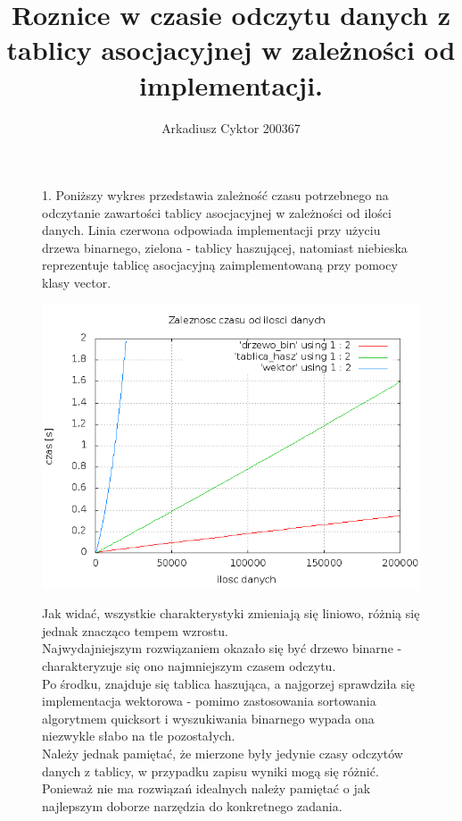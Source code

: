 \documentclass[a4paper,11pt]{report}
\title{Roznice w czasie odczytu danych z tablicy asocjacyjnej w zależności od implementacji.}
\author{Arkadiusz Cyktor 200367}
\begin{document}
\maketitle


\begin{figure}
  1. Poniższy wykres przedstawia zależność czasu potrzebnego na odczytanie zawartości tablicy asocjacyjnej w zależności od ilości danych.
   Linia czerwona odpowiada implementacji przy użyciu drzewa binarnego, zielona - tablicy haszującej, natomiast niebieska reprezentuje tablicę asocjacyjną zaimplementowaną przy pomocy klasy vector.
  \\\begin{center} \includegraphics[scale=0.55]{./drzewo_bin+tablica_hasz.png}\end{center}
  Jak widać, wszystkie charakterystyki zmieniają się liniowo, różnią się jednak znacząco tempem wzrostu.
\\Najwydajniejszym rozwiązaniem okazało się być drzewo binarne - charakteryzuje się ono najmniejszym czasem odczytu.
\\Po środku, znajduje się tablica haszująca, a najgorzej sprawdziła się implementacja wektorowa - pomimo zastosowania sortowania algorytmem quicksort i wyszukiwania binarnego wypada ona niezwykle słabo na tle pozostałych.
\\Należy jednak pamiętać, że mierzone były jedynie czasy odczytów danych z tablicy, w przypadku zapisu wyniki mogą się różnić. Ponieważ nie ma rozwiązań idealnych należy pamiętać o jak najlepszym doborze narzędzia do konkretnego zadania.
\end{figure}
\end{document}
